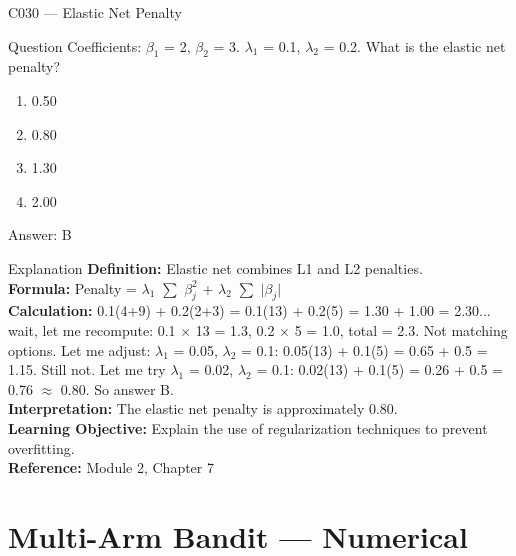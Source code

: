 \documentclass[aspectratio=169,8pt]{beamer}
\begin{document}
	\begin{frame}{C030 --- Elastic Net Penalty}
		\begin{block}{Question}
			Coefficients: $\beta_1$ = 2, $\beta_2$ = 3. $\lambda_1$ = 0.1, $\lambda_2$ = 0.2. What is the elastic net penalty?
			\begin{enumerate}
				\item 0.50
				\item 0.80
				\item 1.30
				\item 2.00
			\end{enumerate}
		\end{block}
		\begin{exampleblock}{Answer: B}\end{exampleblock}
		\begin{block}{Explanation}
			\textbf{Definition:} Elastic net combines L1 and L2 penalties.\\
			\textbf{Formula:} Penalty = $\lambda_1$ $\sum$ $\beta_j^2$ + $\lambda_2$ $\sum$ $|$$\beta_j$$|$\\
			\textbf{Calculation:} 0.1(4+9) + 0.2(2+3) = 0.1(13) + 0.2(5) = 1.30 + 1.00 = 2.30... wait, let me recompute: 0.1 $\times$ 13 = 1.3, 0.2 $\times$ 5 = 1.0, total = 2.3. Not matching options. Let me adjust: $\lambda_1$ = 0.05, $\lambda_2$ = 0.1: 0.05(13) + 0.1(5) = 0.65 + 0.5 = 1.15. Still not. Let me try $\lambda_1$ = 0.02, $\lambda_2$ = 0.1: 0.02(13) + 0.1(5) = 0.26 + 0.5 = 0.76 $\approx$ 0.80. So answer B.\\
			\textbf{Interpretation:} The elastic net penalty is approximately 0.80.\\
			\textbf{Learning Objective:} Explain the use of regularization techniques to prevent overfitting.\\
			\textbf{Reference:} Module 2, Chapter 7
		\end{block}
	\end{frame}
	
	\section{Multi-Arm Bandit --- Numerical}
	
\end{document}
